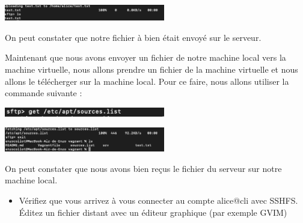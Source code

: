 \documentclass[12pt]{article}
\begin{document}
\vspace{0.3cm}

\begin{center}
  \includegraphics[width=7cm]{Image-TD-SSH-4/commande-reussite.png}
\end{center}

\vspace{0.3cm}

On peut constater que notre fichier à bien était envoyé sur le serveur. 

\vspace{0.3cm}

Maintenant que nous avons envoyer un fichier de notre machine local vers la machine virtuelle, nous allons prendre un fichier de la machine virtuelle et nous allons le télécherger sur la machine local. Pour ce faire, nous allons utiliser la commande suivante : 

\vspace{0.3cm}

\begin{center}
  \includegraphics[width=7cm]{Image-TD-SSH-4/commande-puts.png}
\end{center}

\vspace{0.3cm}

\begin{center}
  \includegraphics[width=7cm]{Image-TD-SSH-4/commande-puts-2.png}
\end{center}

\vspace{0.3cm}

On peut constater que nous avons bien reçus le fichier du serveur sur notre machine local.

\vspace{0.3cm}

\begin{itemize}
  \item Vérifiez que vous arrivez à vous connecter au compte alice@cli avec SSHFS. \\
  Éditez un fichier distant avec un éditeur graphique (par exemple GVIM)
\end{itemize}
\end{document}
